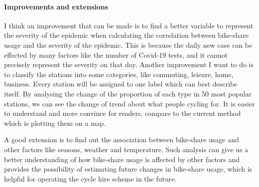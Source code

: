 \documentclass[11pt,a4paper]{article}
\begin{document}


\paragraph{Improvements and extensions}
I think an improvement that can be made is to find a better variable to represent the severity of the epidemic when calculating the correlation between bike-share usage and the severity of the epidemic. This is because the daily new case can be effected by many factors like the number of Covid-19 tests, and it cannot precisely represent the severity on that day. Another improvement I want to do is to classify the stations into some categories, like commuting, leisure, home, business. Every station will be assigned to one label which can best describe itself. By analysing the change of the proportion of each type in 50 most popular stations, we can see the change of trend about what people cycling for. It is easier to understand and more convince for readers, compare to the current method which is plotting them on a map. 

A good extension is to find out the association between bike-share usage and other factors like seasons, weather and temperature. Such analysis can give us a better understanding of how bike-share usage is affected by other factors and provides the possibility of estimating future changes in bike-share usage, which is helpful for operating the cycle hire scheme in the future.



\end{document}
